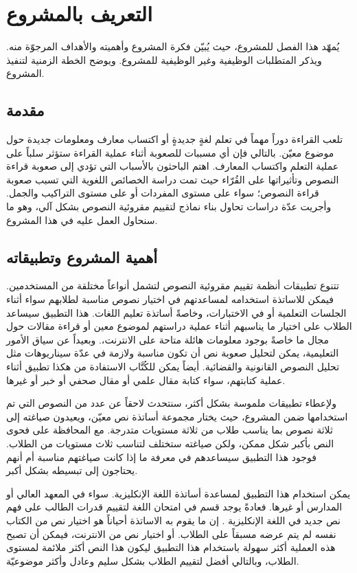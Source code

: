 

\chapter{التعريف بالمشروع}
يُمهّد هذا الفصل للمشروع،
حيث يُبيّن فكرة المشروع وأهميته والأهداف المرجوّة منه.
ويذكر المتطلبات الوظيفية وغير الوظيفية للمشروع.
ويوضح الخطة الزمنية لتنفيذ المشروع.



\section{مقدمة}
تلعب القراءة دوراً مهماً في تعلم لغةٍ جديدةٍ أو اكتساب معارف ومعلومات جديدة حول موضوع معيّن.
بالتالي فإن أي مسببات للصعوبة أثناء عملية القراءة ستؤثر سلباً على عملية التعلم واكتساب المعارف.
اهتم الباحثون بالأسباب التي تؤدي إلى صعوبة قراءة النصوص وتأثيراتها على القُرّاء
حيث تمت دراسة الخصائص اللغوية التي تسبب صعوبة قراءة النصوص؛
سواء على مستوى المفردات أو على مستوى التراكيب والجمل.
وأجريت عدّة دراسات تحاول بناء نماذج لتقييم مقروئية النصوص 
بشكل آلي، وهو ما سنحاول العمل عليه في هذا المشروع.

\section{أهمية المشروع وتطبيقاته}
تتنوع تطبيقات أنظمة تقييم مقروئية النصوص لتشمل أنواعاً مختلقة من المستخدمين.
فيمكن للاساتذة استخدامه لمساعدتهم في اختيار نصوص مناسبة لطلابهم سواء أثناء الجلسات التعلمية أو في الاختبارات،
وخاصةً أساتذة تعليم اللغات.
هذا التطبيق سيساعد الطلاب على اختيار ما يناسبهم أثناء عملية دراستهم لموضوع معين أو قراءة مقالات حول مجال ما
خاصةً بوجود معلومات هائلة متاحة على الانترنت،.
وبعيداً عن سياق الأمور التعليمية،
يمكن لتحليل صعوبة نص أن تكون مناسبة ولازمة في عدّة سيناريوهات مثل تحليل النصوص القانونية والقضائية.
أيضاً يمكن للكُتَّاب الاستفادة من هكذا تطبيق أثناء عملية كتابتهم، سواء كتابة مقال علمي أو مقال صحفي أو خبر أو غيرها.

ولإعطاء تطبيقات ملموسة بشكل أكثر،
سنتحدث لاحقاً عن عدد من النصوص التي تم استخدامها ضمن المشروع،
حيث يختار مجموعة أساتذة نص معيّن، ويعيدون صياغته إلى ثلاثة نصوص بما يناسب طلاب من ثلاثة مستويات متدرجة.
مع المحافظة على فحوى النص بأكبر شكل ممكن، ولكن صياغته ستختلف لتناسب ثلاث مستويات من الطلاب.
فوجود هذا التطبيق سيساعدهم في معرفة ما إذا كانت صياغتهم مناسبة أم  أنهم يحتاجون إلى تبسيطه بشكل أكبر.

يمكن استخدام هذا التطبيق لمساعدة أساتذة اللغة الإنكليزية.
سواء في المعهد العالي أو المدارس أو غيرها.
فعادةً يوجد قسم في امتحان اللغة لتقييم قدرات الطالب على فهم نص جديد في اللغة الإنكليزية .
إن ما يقوم به الاساتذة أحياناً هو اختيار نص من الكتاب نفسه لم يتم عرضه مسبقاً على الطلاب.
أو اختيار نص من الانترنت، فيمكن أن تصبح هذه العملية أكثر سهولة باستخدام هذا التطبيق ليكون هذا النص أكثر ملائمة لمستوى الطلاب،
وبالتالي أفضل لتقييم الطلاب بشكل سليم وعادل وأكثر موضوعيّة.

